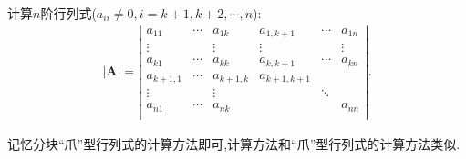 \documentclass[../../main.tex]{subfiles}%
\begin{document}
\begin{proposition}[分块“爪”型行列式]\label{proposition:分块"爪"型行列式}
计算$n$阶行列式($a_{ii}\ne 0,i=k+1,k+2,\cdots,n$):
\begin{align*}
|\boldsymbol{A}|=\left| \begin{matrix}
a_{11}&		\cdots&		a_{1k}&		a_{1,k+1}&		\cdots&		a_{1n}\\
\vdots&		&		\vdots&		\vdots&		&		\vdots\\
a_{k1}&		\cdots&		a_{kk}&		a_{k,k+1}&		\cdots&		a_{kn}\\
a_{k+1,1}&		\cdots&		a_{k+1,k}&		a_{k+1,k+1}&		&		\\
\vdots&		&		\vdots&		&		\ddots&		\\
a_{n1}&		\cdots&		a_{nk}&		&		&		a_{nn}\\
\end{matrix} \right|.
\end{align*}
\end{proposition}
\begin{note}
记忆分块“爪”型行列式的计算方法即可,计算方法和“爪”型行列式的计算方法类似.
\end{note}
\end{document}
